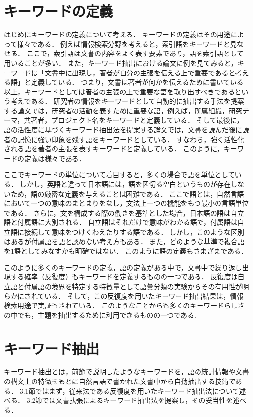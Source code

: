 \documentclass[japanese]{jnlp_1.2c}
\begin{document}
\section{キーワードの定義}
はじめにキーワードの定義について考える．
キーワードの定義はその用途によって様々である．
例えば情報検索分野を考えると，索引語をキーワードと見なせる．
ここで，索引語は文書の内容をよく表す要素であり，語を索引語として用いることが多い\cite{Tokunaga1999}．
また，キーワード抽出における論文に例を見てみると，キーワードは「文書中に出現し，著者が自分の主張を伝える上で重要であると考える語\cite{Mori2005}」と定義している．
つまり，文書は著者が何かを伝えるために書いている以上，キーワードとしては著者の主張の上で重要な語を取り出すべきであるという考えである．
研究者の情報をキーワードとして自動的に抽出する手法を提案する論文\cite{Matumura2002a}では，研究者の活動を表すために重要な語，例えば，所属組織，研究テーマ，共著者，プロジェクト名をキーワードと定義している．
そして最後に，語の活性度に基づくキーワード抽出法を提案する論文\cite{Matumura2002b}では，文書を読んだ後に読者の記憶に強い印象を残す語をキーワードとしている．
すなわち，強く活性化される語を著者の主張を表すキーワードと定義している．
このように，キーワードの定義は様々である．

ここでキーワードの単位について着目すると，多くの場合で語を単位としている．
しかし，英語と違って日本語には，語を区切る空白というものが存在しないため，語の厳密な定義を与えることは困難である．
ここで語とは，自然言語において一つの意味のまとまりをなし，文法上一つの機能をもつ最小の言語単位である\cite{Iwanami1995}．
さらに，文を構成する際の働きを基準とした場合，日本語の語は自立語と付属語に大別される．
自立語はそれだけで意味がわかる語で，付属語は自立語に接続して意味をつけくわえたりする語である．
しかし，このような区別はあるが付属語を語と認めない考え方もある．
また，どのような基準で複合語を1語としてみなすかも明確ではない．
このように語の定義もさまざまである．

このように多くのキーワードの定義，語の定義がある中で，文書中で繰り返し出現する確率（反復度）もキーワードを定義するものの一つである．
反復度は自立語と付属語の境界を特定する特徴量として語彙分類の実験からその有用性が明らかにされている\cite{Church2000}．
そして，この反復度を用いたキーワード抽出結果は，情報検索用途で実証もされている\cite{TakedaAndUmemura2004}．
このようなことからも多くのキーワードらしさの中でも，主題を抽出するために利用できるものの一つである.
\section{キーワード抽出}
キーワード抽出とは，前節で説明したようなキーワードを，語の統計情報や文書の構文上の特徴をもとに自然言語で書かれた文書中から自動抽出する技術である．
3.1節ではまず，従来法である反復度を用いたキーワード抽出法について述べる．
3.2節では文書拡張によるキーワード抽出法を提案し，その妥当性を述べる．
\end{document}
